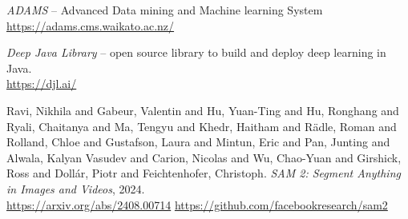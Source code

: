
\begin{thebibliography}{999}

		\textit{ADAMS} -- Advanced Data mining and Machine learning System \\
		\url{https://adams.cms.waikato.ac.nz/}{}

		\textit{Deep Java Library} -- open source library to build and deploy deep learning in Java. \\
		\url{https://djl.ai/}{}

	    Ravi, Nikhila and Gabeur, Valentin and Hu, Yuan-Ting and Hu, Ronghang and Ryali, Chaitanya and Ma, Tengyu
	    and Khedr, Haitham and R{\"a}dle, Roman and Rolland, Chloe and Gustafson, Laura and Mintun, Eric and Pan, Junting
	    and Alwala, Kalyan Vasudev and Carion, Nicolas and Wu, Chao-Yuan and Girshick, Ross and Doll{\'a}r, Piotr
	    and Feichtenhofer, Christoph. \textit{SAM 2: Segment Anything in Images and Videos}, 2024. \\
		\url{https://arxiv.org/abs/2408.00714}{}
		\url{https://github.com/facebookresearch/sam2}{}

\end{thebibliography}

